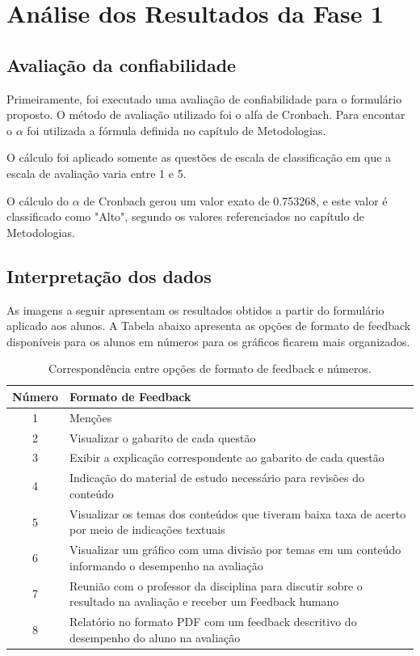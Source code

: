 \chapter{Análise dos Resultados da Fase 1}

\section{Avaliação da confiabilidade}

Primeiramente, foi executado uma avaliação de confiabilidade para o formulário proposto. O método de avaliação utilizado foi o alfa de Cronbach. Para encontar o $\alpha$ foi utilizada a fórmula definida no capítulo de Metodologias.

O cálculo foi aplicado somente as questões de escala de classificação em que a escala de avaliação varia entre 1 e 5.

O cálculo do $\alpha$ de Cronbach gerou um valor exato de 0.753268, e este valor é classificado como "Alto", segundo os valores referenciados no capítulo de Metodologias. 

\section{Interpretação dos dados}

As imagens a seguir apresentam os resultados obtidos a partir do formulário aplicado aos alunos. A Tabela abaixo apresenta as opções de formato de feedback disponíveis para os alunos em números para os gráficos ficarem mais organizados.

\begin{table}[h!]
    \centering
    \begin{tabular}{|c|p{10cm}|}
        \hline
        \textbf{Número} & \textbf{Formato de Feedback} \\
        \hline
        1 & Menções \\
        \hline
        2 & Visualizar o gabarito de cada questão \\
        \hline
        3 & Exibir a explicação correspondente ao gabarito de cada questão \\
        \hline
        4 & Indicação do material de estudo necessário para revisões do conteúdo \\
        \hline
        5 & Visualizar os temas dos conteúdos que tiveram baixa taxa de acerto por meio de indicações textuais \\
        \hline
        6 & Visualizar um gráfico com uma divisão por temas em um conteúdo informando o desempenho na avaliação \\
        \hline
        7 & Reunião com o professor da disciplina para discutir sobre o resultado na avaliação e receber um Feedback humano \\
        \hline
        8 & Relatório no formato PDF com um feedback descritivo do desempenho do aluno na avaliação \\
        \hline
    \end{tabular}
    \caption{Correspondência entre opções de formato de feedback e números.}
    \label{tab:feedback_options}
\end{table}

